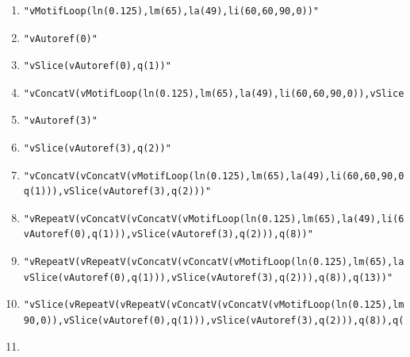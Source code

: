 \documentclass{article}
\begin{document}
\begin{table}[ht]
{\small \begin{enumerate}[start=0]
\item \begin{verbatim}
"vMotifLoop(ln(0.125),lm(65),la(49),li(60,60,90,0))"
\end{verbatim}
\item \begin{verbatim}
"vAutoref(0)"
\end{verbatim}
\item \begin{verbatim}
"vSlice(vAutoref(0),q(1))"
\end{verbatim}
\item \begin{verbatim}
"vConcatV(vMotifLoop(ln(0.125),lm(65),la(49),li(60,60,90,0)),vSlice(vAutoref(0),q(1)))"
\end{verbatim}
\item \begin{verbatim}
"vAutoref(3)"
\end{verbatim}
\item \begin{verbatim}
"vSlice(vAutoref(3),q(2))"
\end{verbatim}
\item \begin{verbatim}
"vConcatV(vConcatV(vMotifLoop(ln(0.125),lm(65),la(49),li(60,60,90,0)),vSlice(vAutoref(0),
q(1))),vSlice(vAutoref(3),q(2)))"
\end{verbatim}
\item \begin{verbatim}
"vRepeatV(vConcatV(vConcatV(vMotifLoop(ln(0.125),lm(65),la(49),li(60,60,90,0)),vSlice(
vAutoref(0),q(1))),vSlice(vAutoref(3),q(2))),q(8))"
\end{verbatim}
\item \begin{verbatim}
"vRepeatV(vRepeatV(vConcatV(vConcatV(vMotifLoop(ln(0.125),lm(65),la(49),li(60,60,90,0)),
vSlice(vAutoref(0),q(1))),vSlice(vAutoref(3),q(2))),q(8)),q(13))"
\end{verbatim}
\item \begin{verbatim}
"vSlice(vRepeatV(vRepeatV(vConcatV(vConcatV(vMotifLoop(ln(0.125),lm(65),la(49),li(60,60,
90,0)),vSlice(vAutoref(0),q(1))),vSlice(vAutoref(3),q(2))),q(8)),q(13)),q(-12))"
\end{verbatim}
\item \begin{verbatim}

\end{verbatim}
\end{enumerate}}
\end{table}
\end{document}
